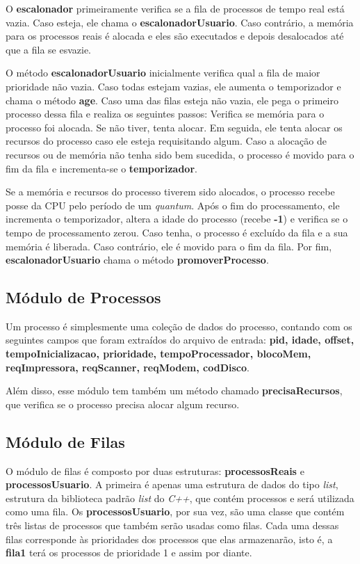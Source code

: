 \documentclass[a4paper]{article}
\begin{document}
O \textbf{escalonador} primeiramente verifica se a fila de processos de tempo real está vazia. Caso esteja, ele chama o \textbf{escalonadorUsuario}. 
Caso contrário, a memória para os processos reais é alocada e eles são executados e depois desalocados até que a fila se esvazie.

O método \textbf{escalonadorUsuario} inicialmente verifica qual a fila de maior prioridade não vazia. Caso todas estejam vazias, ele aumenta o temporizador e chama o método \textbf{age}.
Caso uma das filas esteja não vazia, ele pega o primeiro processo dessa fila e realiza os seguintes passos: 
Verifica se memória para o processo foi alocada. Se não tiver, tenta alocar. Em seguida, ele tenta alocar os recursos do processo caso ele esteja requisitando algum.
Caso a alocação de recursos ou de memória não tenha sido bem sucedida, o processo é movido para o fim da fila e incrementa-se o \textbf{temporizador}.

Se a memória e recursos do processo tiverem sido alocados, o processo recebe posse da CPU pelo período de um \emph{quantum}. Após o fim do processamento, ele incrementa o temporizador, altera a idade do processo (recebe \textbf{-1}) e verifica se o tempo de processamento zerou. Caso tenha, o processo é excluído da fila e a sua memória é liberada. Caso contrário, ele é movido para o fim da fila.
Por fim, \textbf{escalonadorUsuario} chama o método \textbf{promoverProcesso}.

\subsection{Módulo de Processos}
Um processo é simplesmente uma coleção de dados do processo, contando com os seguintes campos que foram extraídos do arquivo de entrada: \textbf{pid, idade, offset, tempoInicializacao, prioridade, tempoProcessador, blocoMem, reqImpressora, reqScanner, reqModem, codDisco}.

Além disso, esse módulo tem também um método chamado \textbf{precisaRecursos}, que verifica se o processo precisa alocar algum recurso.

\subsection{Módulo de Filas}
O módulo de filas é composto por duas estruturas: \textbf{processosReais} e \textbf{processosUsuario}. A primeira é apenas uma estrutura de dados do tipo \emph{list}, estrutura da biblioteca padrão \emph{list} do \emph{C++}, que contém processos e será utilizada como uma fila. Os \textbf{processosUsuario}, por sua vez, são uma classe que contém três listas de processos que também serão usadas como filas. Cada uma dessas filas corresponde às prioridades dos processos que elas armazenarão, isto é, a \textbf{fila1} terá os processos de prioridade 1 e assim por diante.
\end{document}
